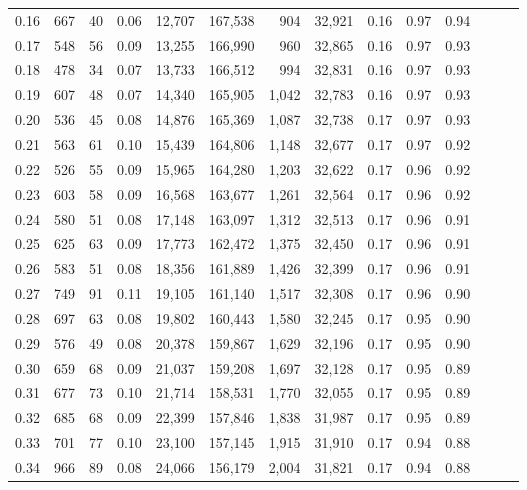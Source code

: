 \begin{tabular}{rrrrrrrrrrrrrr}
0.16 &    667 &     40 &  0.06 &   12,707 &  167,538 &     904 &  32,921 &  0.16 &  0.97 &      0.94 \\
0.17 &    548 &     56 &  0.09 &   13,255 &  166,990 &     960 &  32,865 &  0.16 &  0.97 &      0.93 \\
0.18 &    478 &     34 &  0.07 &   13,733 &  166,512 &     994 &  32,831 &  0.16 &  0.97 &      0.93 \\
0.19 &    607 &     48 &  0.07 &   14,340 &  165,905 &   1,042 &  32,783 &  0.16 &  0.97 &      0.93 \\
0.20 &    536 &     45 &  0.08 &   14,876 &  165,369 &   1,087 &  32,738 &  0.17 &  0.97 &      0.93 \\
0.21 &    563 &     61 &  0.10 &   15,439 &  164,806 &   1,148 &  32,677 &  0.17 &  0.97 &      0.92 \\
0.22 &    526 &     55 &  0.09 &   15,965 &  164,280 &   1,203 &  32,622 &  0.17 &  0.96 &      0.92 \\
0.23 &    603 &     58 &  0.09 &   16,568 &  163,677 &   1,261 &  32,564 &  0.17 &  0.96 &      0.92 \\
0.24 &    580 &     51 &  0.08 &   17,148 &  163,097 &   1,312 &  32,513 &  0.17 &  0.96 &      0.91 \\
0.25 &    625 &     63 &  0.09 &   17,773 &  162,472 &   1,375 &  32,450 &  0.17 &  0.96 &      0.91 \\
0.26 &    583 &     51 &  0.08 &   18,356 &  161,889 &   1,426 &  32,399 &  0.17 &  0.96 &      0.91 \\
0.27 &    749 &     91 &  0.11 &   19,105 &  161,140 &   1,517 &  32,308 &  0.17 &  0.96 &      0.90 \\
0.28 &    697 &     63 &  0.08 &   19,802 &  160,443 &   1,580 &  32,245 &  0.17 &  0.95 &      0.90 \\
0.29 &    576 &     49 &  0.08 &   20,378 &  159,867 &   1,629 &  32,196 &  0.17 &  0.95 &      0.90 \\
0.30 &    659 &     68 &  0.09 &   21,037 &  159,208 &   1,697 &  32,128 &  0.17 &  0.95 &      0.89 \\
0.31 &    677 &     73 &  0.10 &   21,714 &  158,531 &   1,770 &  32,055 &  0.17 &  0.95 &      0.89 \\
0.32 &    685 &     68 &  0.09 &   22,399 &  157,846 &   1,838 &  31,987 &  0.17 &  0.95 &      0.89 \\
0.33 &    701 &     77 &  0.10 &   23,100 &  157,145 &   1,915 &  31,910 &  0.17 &  0.94 &      0.88 \\
0.34 &    966 &     89 &  0.08 &   24,066 &  156,179 &   2,004 &  31,821 &  0.17 &  0.94 &      0.88 \\

\end{tabular}
